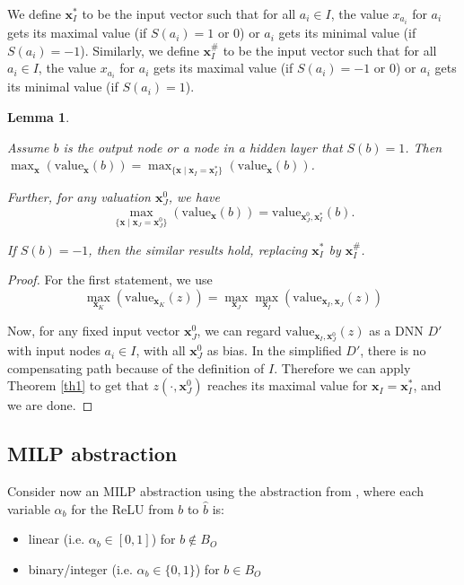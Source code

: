 \documentclass[]{article}
\newtheorem{lemma}{Lemma}
\theoremstyle{definition}
\newcommand{\Val}{\mathrm{value}}
\begin{document}
			We define $\boldsymbol{x}_I^*$ to be the input vector such that for all $a_i \in I$, the value $x_{a_i}$ for $a_i$ gets its maximal value (if $S(a_i)=1$ or $0$) or $a_i$ gets its minimal value (if $S(a_i)=-1$). Similarly, we define $\boldsymbol{x}_I^\#$ to be the input vector such that for all $a_i \in I$, the value $x_{a_i}$ for $a_i$ gets its maximal value (if $S(a_i)=-1$ or $0$) or $a_i$ gets its minimal value (if $S(a_i)=1$).
			
			
			
			\begin{lemma} \label{lem:reach_max_2}
				
				Assume $b$ is the output node or a node in a hidden layer that $S(b)=1$. Then
				$\max_{\boldsymbol{x}} (\Val_{\boldsymbol{x}}(b)) =\max_{\{\boldsymbol{x} \mid \boldsymbol{x}_I=\boldsymbol{x}^*_I\}} (\Val_{\boldsymbol{x}}(b))$.
				
				Further,  for any valuation $\boldsymbol{x}^0_J$, 
				we have $$\max_{\{\boldsymbol{x} \mid \boldsymbol{x}_J=\boldsymbol{x}^0_J\}} (\Val_{\boldsymbol{x}}(b)) =  \Val_{\boldsymbol{x}^0_J,\boldsymbol{x}_I^*}(b).$$
				
				If $S(b)=-1$, then the similar results hold, replacing $\boldsymbol{x}^*_I$ by $\boldsymbol{x}^\#_I$. 
			\end{lemma}
			
			\begin{proof}
				For the first statement, we use 
				$$\max_{\boldsymbol{x}_K} (\Val_{\boldsymbol{x}_K}(z)) =\max_{\boldsymbol{x}_J} \max_{\boldsymbol{x}_I} (\Val_{\boldsymbol{x}_I,\boldsymbol{x}_J}(z))$$
				
				Now, for any fixed input vector $\boldsymbol{x}^0_J$, we can regard $\Val_{\boldsymbol{x}_I,\boldsymbol{x}^0_J}(z)$ as a DNN $D'$ with input nodes $a_i\in I$, with all $\boldsymbol{x}^0_J$ %
				as bias. In the simplified $D'$, there is no compensating path because of the definition of $I$. Therefore we can apply Theorem \ref{th1} to get that $z(\cdot,\boldsymbol{x}^0_J)$ reaches its maximal value for $\boldsymbol{x}_I=\boldsymbol{x}_I^*$, and we are done.
			\end{proof}
			
			
			\subsection{MILP abstraction}
			
			Consider now an MILP abstraction using the abstraction from \cite{MILP}, 
			where each variable $\alpha_b$ for the ReLU from $b$ to $\hat{b}$ is:
			\begin{itemize}
				\item linear  (i.e. $\alpha_b \in [0,1]$) for $b \notin B_{O}$
				\item binary/integer (i.e. $\alpha_b \in \{0,1\}$) for $b \in B_{O}$
			\end{itemize}
			
\end{document}
